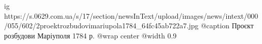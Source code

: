  
 
 
 
 

\ifcmt
  ig https://s.0629.com.ua/s/17/section/newsInText/upload/images/news/intext/000/055/602/2proektrozbudovimariupola1784_64fc45ab722a7.jpg
	@caption Проєкт розбудови Маріуполя 1784 р.
  @wrap center
  @width 0.9
\fi
